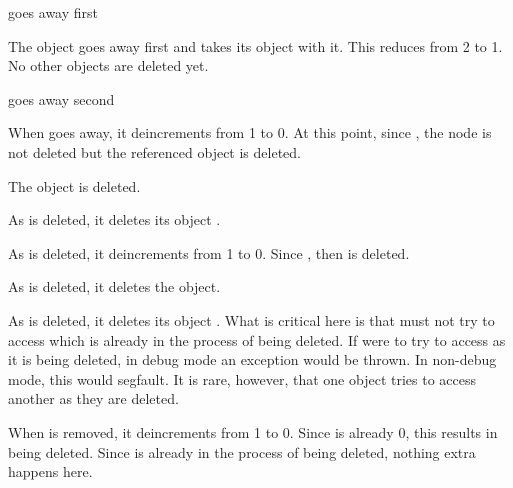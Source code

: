 \documentclass[pdf,ps2pdf,11pt]{SANDreport}
\begin{document}
\begin{description}

{}\item[a)] {} goes away first

  \begin{description}

  {}\item[a.1)] The {} object goes away first and takes
  its {} object {} with it.  This reduces
  {} from 2 to 1.  No other objects are
  deleted yet.

  \end{description}

{}\item[b)] {} goes away second

  \begin{description}

  {}\item[b.1)] When {} goes away, it deincrements
  {} from 1 to 0.  At this point, since
  {}, the node is not deleted but the
  referenced object {} is deleted.

  {}\item[b.2)] The object {} is deleted.

  {}\item[b.3)] As {} is deleted, it deletes its
  {} object {}.

  {}\item[b.4)] As {} is deleted, it deincrements
  {} from 1 to 0. Since
  {}, then {} is deleted.

  {}\item[b.5)] As {} is deleted, it deletes the
  {} object.

  {}\item[b.6)] As {} is deleted, it deletes its
  {} object {}.  What is critical here is
  that {} must not try to access {} which is
  already in the process of being deleted.  If {} were to
  try to access {} as it is being deleted, in debug mode an
  exception would be thrown.  In non-debug mode, this would segfault.
  It is rare, however, that one object tries to access another as they
  are deleted.

  {}\item[b.7)] When {} is removed, it deincrements
  {} from 1 to 0.  Since
  {} is already 0, this results in
  {} being deleted.  Since {} is already in
  the process of being deleted, nothing extra happens here.

  \end{description}

\end{description}
\end{document}
